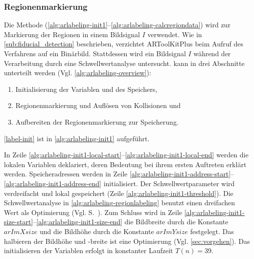\subsubsection{Regionenmarkierung} %
\label{sub:regionenmarkierung}

Die Methode  (\autoref{alg:arlabeling-init1}--\autoref{alg:arlabeling-calcregiondata}) wird zur
 Markierung der Regionen in einem Bildsignal $I$ verwendet. Wie in \autoref{sub:fiducial_detection} beschrieben,
 verzichtet ARToolKitPlus beim Aufruf des Verfahrens auf ein Binärbild. Stattdessen wird ein Bildsignal $I$ während der
 Verarbeitung durch eine Schwellwertanalyse untersucht.  kann in drei Abschnitte unterteilt werden
 (Vgl. \autoref{alg:arlabeling-overview}):
\begin{enumerate}
	\item Initialisierung der Variablen und des Speichers, \label{label-init}
	\item Regionenmarkierung und Auflösen von Kollisionen und \label{label-region}
	\item Aufbereiten der Regionenmarkierung zur Speicherung. \label{label-cleaning}
\end{enumerate}


\autoref{label-init} ist in \autoref{alg:arlabeling-init1} aufgeführt.

In Zeile \ref{alg:arlabeling-init1-local-start}--\ref{alg:arlabeling-init1-local-end} werden die lokalen Variablen
 deklariert, deren Bedeutung bei ihrem ersten Auftreten erklärt werden. Speicheradressen werden in Zeile
 \ref{alg:arlabeling-init1-address-start}--\ref{alg:arlabeling-init1-address-end} initialisiert. Der
 Schwellwertparameter wird verdreifacht und lokal gespeichert (Zeile \ref{alg:arlabeling-init1-threshold}). Die
 Schwellwertanalyse in \autoref{alg:arlabeling-regionlabeling} benutzt einen dreifachen Wert als Optimierung
 (Vgl. S.~\pageref{sub:arlabel-threshold}). Zum Schluss wird in Zeile
 \ref{alg:arlabeling-init1-size-start}--\ref{alg:arlabeling-init1-size-end} die Bildbreite durch die Konstante
 $\mathit{arImXsize}$ und die Bildhöhe durch die Konstante $\mathit{arImYsize}$ festgelegt. Das halbieren der Bildhöhe
 und -breite ist eine Optimierung (Vgl. \autoref{sec:vorgehen}). Das initialisieren der Variablen erfolgt in konstanter
 Laufzeit $T(n) = 39$.

